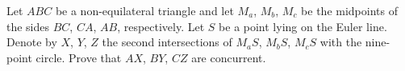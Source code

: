 Let $ABC$ be a non-equilateral triangle and let $M_a$, $M_b$, $M_c$ be the midpoints of the sides $BC$, $CA$, $AB$, respectively. Let $S$ be a point lying on the Euler line. Denote by $X$, $Y$, $Z$ the second intersections of $M_aS$, $M_bS$, $M_cS$ with the nine-point circle. Prove that $AX$, $BY$, $CZ$ are concurrent.